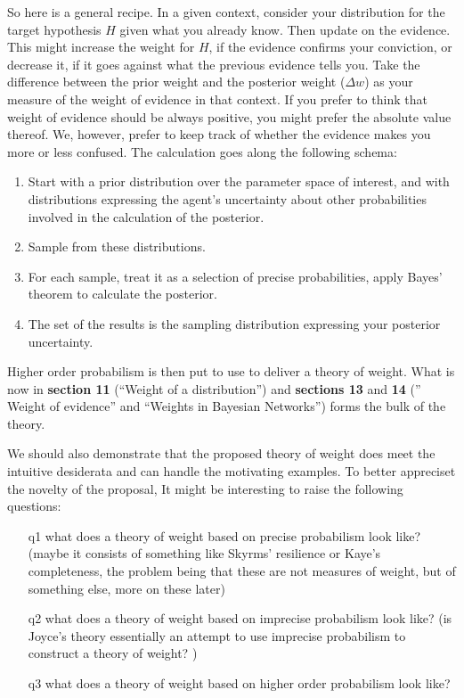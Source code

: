 \documentclass[
  10pt,
  dvipsnames,enabledeprecatedfontcommands]{scrartcl}
\begin{document}
So here is a general recipe. In a given context, consider your
distribution for the target hypothesis \(H\) given what you already
know. Then update on the evidence. This might increase the weight for
\(H\), if the evidence confirms your conviction, or decrease it, if it
goes against what the previous evidence tells you. Take the difference
between the prior weight and the posterior weight (\(\Delta w\)) as your
measure of the weight of evidence in that context. If you prefer to
think that weight of evidence should be always positive, you might
prefer the absolute value thereof. We, however, prefer to keep track of
whether the evidence makes you more or less confused. The calculation
goes along the following schema:

\begin{enumerate}
\item Start with a prior distribution over the parameter space of interest, and with distributions expressing the agent's uncertainty about other probabilities involved in the calculation of the posterior.
\item Sample from these distributions.
\item For each sample, treat it as a selection of precise probabilities, apply Bayes' theorem to calculate the posterior.
\item The set of the results is the sampling distribution expressing your posterior uncertainty.
\end{enumerate}

Higher order probabilism is then put to use to deliver a theory of
weight. What is now in \textbf{section 11} (``Weight of a
distribution'') and \textbf{sections 13} and \textbf{14} ('' Weight of
evidence'' and ``Weights in Bayesian Networks'') forms the bulk of the
theory.

We should also demonstrate that the proposed theory of weight does meet
the intuitive desiderata and can handle the motivating examples. To
better appreciset the novelty of the proposal, It might be interesting
to raise the following questions:

\begin{itemize}

\item[q1] what does a theory of weight based on precise probabilism look like? (maybe it consists of something like Skyrms' resilience or Kaye's completeness, the problem being that these are not measures of weight, but of something else, more on these later)

\item[q2] what does a theory of weight based on imprecise probabilism look like? (is Joyce's theory essentially an attempt to use imprecise probabilism to construct a theory of weight? )

\item[q3] what does a theory of weight based on higher order probabilism look like?

\end{itemize}
\end{document}
